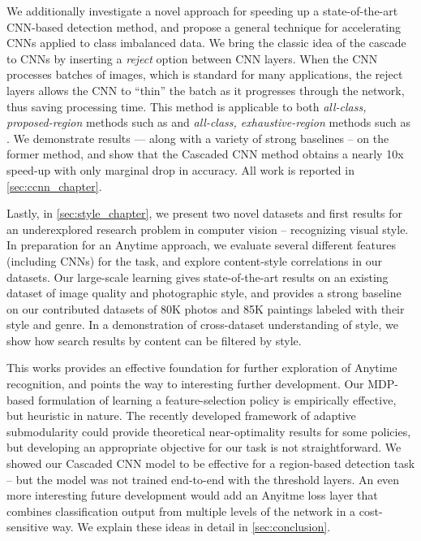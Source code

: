 We additionally investigate a novel approach for speeding up a state-of-the-art CNN-based detection method, and propose a general technique for accelerating CNNs applied to class imbalanced data.
We bring the classic idea of the cascade to CNNs by inserting a \emph{reject} option between CNN layers.
When the CNN processes batches of images, which is standard for many applications, the reject layers allows the CNN to ``thin'' the batch as it progresses through the network, thus saving processing time.
This method is applicable to both \emph{all-class, proposed-region} methods such as \cite{Girshick-CVPR-2014} and \emph{all-class, exhaustive-region} methods such as \cite{He-ECCV-2014}.
We demonstrate results --- along with a variety of strong baselines -- on the former method, and show that the Cascaded CNN method obtains a nearly 10x speed-up with only marginal drop in accuracy.
All work is reported in \autoref{sec:ccnn_chapter}.

Lastly, in \autoref{sec:style_chapter}, we present two novel datasets and first results for an underexplored research problem in computer vision -- recognizing visual style.
In preparation for an Anytime approach, we evaluate several different features (including CNNs) for the task, and explore content-style correlations in our datasets.
Our large-scale learning gives state-of-the-art results on an existing dataset of image quality and photographic style, and provides a strong baseline on our contributed datasets of 80K photos and 85K paintings labeled with their style and genre.
In a demonstration of cross-dataset understanding of style, we show how search results by content can be filtered by style.

This works provides an effective foundation for further exploration of Anytime recognition, and points the way to interesting further development.
Our MDP-based formulation of learning a feature-selection policy is empirically effective, but heuristic in nature.
The recently developed framework of adaptive submodularity \parencite{Golovin-and-Krause-2010-JAIR} could provide theoretical near-optimality results for some policies, but developing an appropriate objective for our task is not straightforward.
We showed our Cascaded CNN model to be effective for a region-based detection task -- but the model was not trained end-to-end with the threshold layers.
An even more interesting future development would add an Anyitme loss layer that combines classification output from multiple levels of the network in a cost-sensitive way.
We explain these ideas in detail in \autoref{sec:conclusion}.
